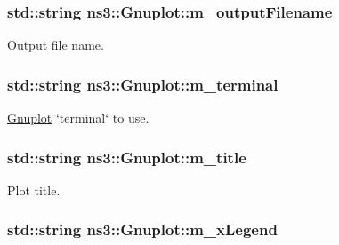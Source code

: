 \subsubsection[{\texorpdfstring{m\+\_\+output\+Filename}{m_outputFilename}}]{\setlength{\rightskip}{0pt plus 5cm}std\+::string ns3\+::\+Gnuplot\+::m\+\_\+output\+Filename\hspace{0.3cm}{\ttfamily [private]}}\hypertarget{classns3_1_1Gnuplot_aa22986d3af73e9b62a6eaadaf1b43763}{}\label{classns3_1_1Gnuplot_aa22986d3af73e9b62a6eaadaf1b43763}


Output file name. 

\subsubsection[{\texorpdfstring{m\+\_\+terminal}{m_terminal}}]{\setlength{\rightskip}{0pt plus 5cm}std\+::string ns3\+::\+Gnuplot\+::m\+\_\+terminal\hspace{0.3cm}{\ttfamily [private]}}\hypertarget{classns3_1_1Gnuplot_a57041922a660f3a33e8f2f5f75ad9b83}{}\label{classns3_1_1Gnuplot_a57041922a660f3a33e8f2f5f75ad9b83}


\hyperlink{classns3_1_1Gnuplot}{Gnuplot} \char`\"{}terminal\char`\"{} to use. 

\subsubsection[{\texorpdfstring{m\+\_\+title}{m_title}}]{\setlength{\rightskip}{0pt plus 5cm}std\+::string ns3\+::\+Gnuplot\+::m\+\_\+title\hspace{0.3cm}{\ttfamily [private]}}\hypertarget{classns3_1_1Gnuplot_a7a600dbd860152df160e84b82026ffda}{}\label{classns3_1_1Gnuplot_a7a600dbd860152df160e84b82026ffda}


Plot title. 

\subsubsection[{\texorpdfstring{m\+\_\+x\+Legend}{m_xLegend}}]{\setlength{\rightskip}{0pt plus 5cm}std\+::string ns3\+::\+Gnuplot\+::m\+\_\+x\+Legend\hspace{0.3cm}{\ttfamily [private]}}\hypertarget{classns3_1_1Gnuplot_a98f4044a69ababcd17550375e487bdb6}{}\label{classns3_1_1Gnuplot_a98f4044a69ababcd17550375e487bdb6}


